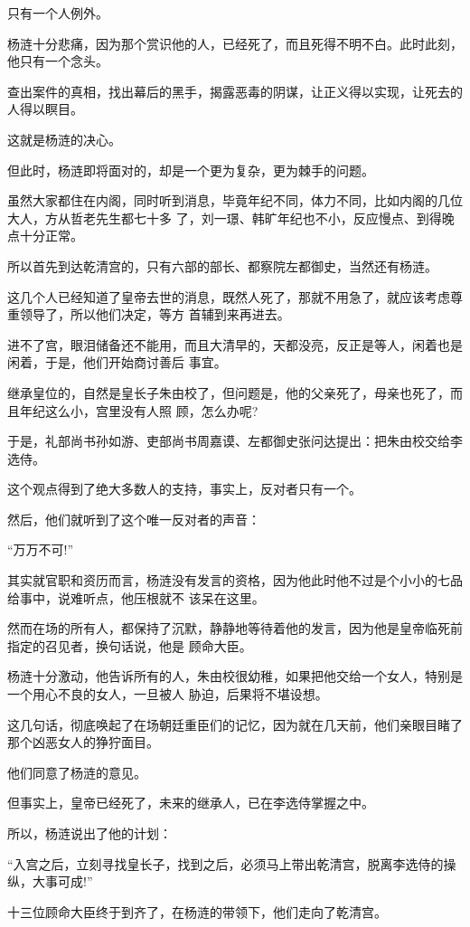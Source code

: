 \documentclass[11pt,a4paper,onecolumn]{article}
\begin{document}
只有一个人例外。

杨涟十分悲痛，因为那个赏识他的人，已经死了，而且死得不明不白。此时此刻，他只有一个念头。

查出案件的真相，找出幕后的黑手，揭露恶毒的阴谋，让正义得以实现，让死去的人得以瞑目。

这就是杨涟的决心。

但此时，杨涟即将面对的，却是一个更为复杂，更为棘手的问题。

虽然大家都住在内阁，同时听到消息，毕竟年纪不同，体力不同，比如内阁的几位大人，方从哲老先生都七十多
了，刘一璟、韩旷年纪也不小，反应慢点、到得晚点十分正常。

所以首先到达乾清宫的，只有六部的部长、都察院左都御史，当然还有杨涟。

这几个人已经知道了皇帝去世的消息，既然人死了，那就不用急了，就应该考虑尊重领导了，所以他们决定，等方
首辅到来再进去。

进不了宫，眼泪储备还不能用，而且大清早的，天都没亮，反正是等人，闲着也是闲着，于是，他们开始商讨善后
事宜。

继承皇位的，自然是皇长子朱由校了，但问题是，他的父亲死了，母亲也死了，而且年纪这么小，宫里没有人照
顾，怎么办呢?

于是，礼部尚书孙如游、吏部尚书周嘉谟、左都御史张问达提出：把朱由校交给李选侍。

这个观点得到了绝大多数人的支持，事实上，反对者只有一个。

然后，他们就听到了这个唯一反对者的声音：

``万万不可!''

其实就官职和资历而言，杨涟没有发言的资格，因为他此时他不过是个小小的七品给事中，说难听点，他压根就不
该呆在这里。

然而在场的所有人，都保持了沉默，静静地等待着他的发言，因为他是皇帝临死前指定的召见者，换句话说，他是
顾命大臣。

杨涟十分激动，他告诉所有的人，朱由校很幼稚，如果把他交给一个女人，特别是一个用心不良的女人，一旦被人
胁迫，后果将不堪设想。

这几句话，彻底唤起了在场朝廷重臣们的记忆，因为就在几天前，他们亲眼目睹了那个凶恶女人的狰狞面目。

他们同意了杨涟的意见。

但事实上，皇帝已经死了，未来的继承人，已在李选侍掌握之中。

所以，杨涟说出了他的计划：

``入宫之后，立刻寻找皇长子，找到之后，必须马上带出乾清宫，脱离李选侍的操纵，大事可成!''

十三位顾命大臣终于到齐了，在杨涟的带领下，他们走向了乾清宫。
\end{document}
